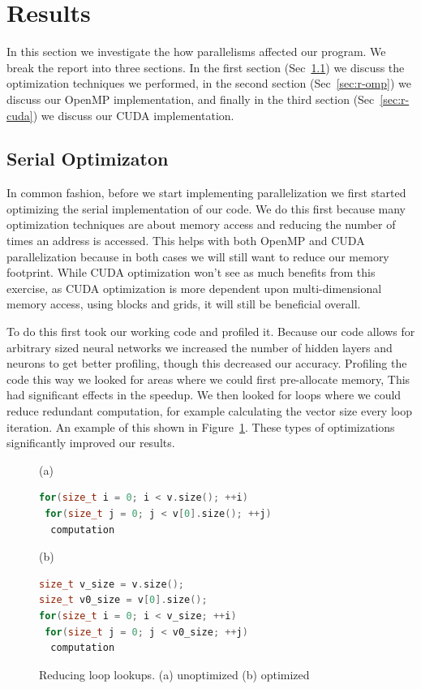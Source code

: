 \section{Results}\label{sec:results}
In this section we investigate the how parallelisms affected our program. We
break the report into three sections. In the first section (Sec~\ref{sec:r-opt})
we discuss the optimization techniques we performed, in the second
section (Sec~\ref{sec:r-omp}) we discuss our OpenMP implementation, and finally
in the third section (Sec~\ref{sec:r-cuda}) we discuss our CUDA implementation. 

\subsection{Serial Optimizaton}\label{sec:r-opt}
In common fashion, before we start implementing parallelization we first started
optimizing the serial implementation of our code. We do this first because many
optimization techniques are about memory access and reducing the number of times
an address is accessed. This helps with both OpenMP and CUDA parallelization
because in both cases we will still want to reduce our memory footprint. While
CUDA optimization won't see as much benefits from this exercise, as CUDA
optimization is more dependent upon multi-dimensional memory access, using
blocks and grids, it will still be beneficial overall. 

To do this first took our working code and profiled it. Because our code allows
for arbitrary sized neural networks we increased the number of hidden layers and
neurons to get better profiling, though this decreased our accuracy. 
Profiling the code this way we looked for areas where we could
first pre-allocate memory, This had significant effects in the speedup. We then
looked for loops where we could reduce redundant computation, for example
calculating the vector size every loop iteration. An example of this shown in 
Figure~\ref{fig:opt}. These types of optimizations significantly improved our
results. 

\begin{figure}[ht]
(a)
\begin{lstlisting}[language=C++,
                   directivestyle={\color{black}},
                   emph={size_t},
                   emphstyle={\color{blue}}]
for(size_t i = 0; i < v.size(); ++i)
 for(size_t j = 0; j < v[0].size(); ++j)
  computation
\end{lstlisting}
(b)
\begin{lstlisting}[language=C++,
                   directivestyle={\color{black}},
                   emph={size_t},
                   emphstyle={\color{blue}}]
size_t v_size = v.size();
size_t v0_size = v[0].size();
for(size_t i = 0; i < v_size; ++i)
 for(size_t j = 0; j < v0_size; ++j)
  computation
\end{lstlisting}
\caption{Reducing loop lookups. (a) unoptimized (b) optimized}
\label{fig:opt}
\end{figure}


